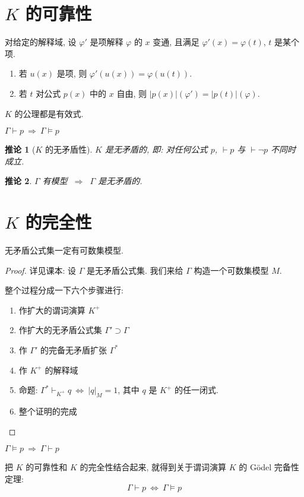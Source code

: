\documentclass[
    mode=hazy,
    color=blue,
    device=normal,
    lang=cn
]{elegantnote}
\newtheorem{deduction}{推论}[section]
\begin{document}
\section{\texorpdfstring{$K$}{K} 的可靠性}
\begin{lemma}
    对给定的解释域, 设 $\varphi'$ 是项解释 $\varphi$ 的 $x$ 变通, 且满足 $\varphi'(x)=\varphi(t)$, $t$ 是某个项.
    \begin{enumerate}[label = $\arabic*^\circ$]
        \item 若 $u(x)$ 是项, 则 $\varphi'(u(x)) = \varphi(u(t))$.
        \item 若 $t$ 对公式 $p(x)$ 中的 $x$ 自由, 则 $\lvert p(x)\rvert(\varphi')=\lvert p(t)\rvert(\varphi)$.
    \end{enumerate}
\end{lemma}
\begin{lemma}
    $K$ 的公理都是有效式.
\end{lemma}
\begin{theorem}[$K$ 的可靠性]
    $\Gamma\vdash p\ \Rightarrow\ \Gamma\vDash p$
\end{theorem}
\begin{deduction}[$K$ 的无矛盾性]
    $K$ 是无矛盾的, 即: 对任何公式 $p$, $\vdash p$ 与 $\vdash\lnot p$ 不同时成立.
\end{deduction}
\begin{deduction}
    $\Gamma$ 有模型 $\ \Rightarrow\ $ $\Gamma$ 是无矛盾的.
\end{deduction}

\section{\texorpdfstring{$K$}{K} 的完全性}
\begin{definition}
    无矛盾公式集一定有可数集模型.
\end{definition}
\begin{proof}
    详见课本: 设 $\Gamma$ 是无矛盾公式集. 我们来给 $\Gamma$ 构造一个可数集模型 $M$.

    整个过程分成一下六个步骤进行:
    \begin{enumerate}[1.]
        \item 作扩大的谓词演算 $K^+$
        \item 作扩大的无矛盾公式集 $\Gamma'\supset \Gamma$
        \item 作 $\Gamma'$ 的完备无矛盾扩张 $\Gamma^*$
        \item 作 $K^+$ 的解释域
        \item 命题: $\Gamma^*\vdash_{K^+}q\ \Leftrightarrow\ \lvert q\rvert_M = 1$, 其中 $q$ 是 $K^+$ 的任一闭式.
        \item 整个证明的完成
    \end{enumerate}
\end{proof}
\begin{theorem}[$K$ 的完全性]
    $\Gamma\vDash p\ \Rightarrow\ \Gamma\vdash p$
\end{theorem}
把 $K$ 的可靠性和 $K$ 的完全性结合起来, 就得到关于谓词演算 $K$ 的 Gödel 完备性定理:
$$
    \Gamma\vdash p\ \Leftrightarrow\ \Gamma\vDash p
$$
\end{document}
